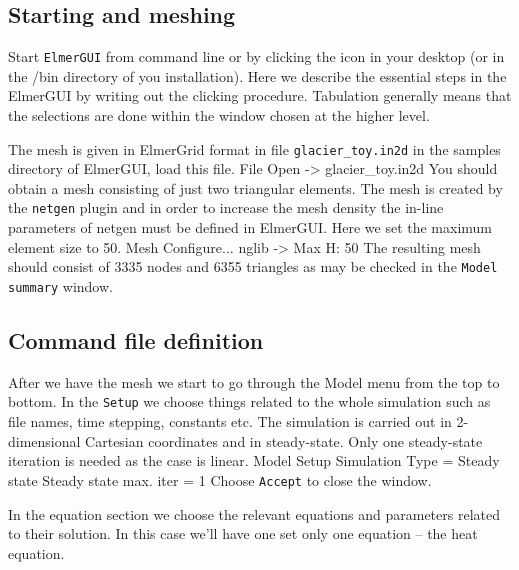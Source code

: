 \subsection*{Starting and meshing}

Start \texttt{ElmerGUI} from command line or by clicking the icon in your desktop (or in the /bin directory of you installation). 
Here we describe the essential steps in the ElmerGUI by writing out the clicking procedure. Tabulation generally means that the 
selections are done within the window chosen at the higher level. 

The mesh is given in ElmerGrid format in file \texttt{glacier\_toy.in2d} in the samples directory of ElmerGUI, 
load this file.
\ttbegin
File 
  Open -> glacier\_toy.in2d
\ttend
You should obtain a mesh consisting of just two triangular elements. The mesh is created by the \texttt{netgen} plugin 
and in order to increase the mesh density the in-line parameters of netgen must be defined in ElmerGUI.
Here we set the maximum element size to 50. 
\ttbegin
Mesh
  Configure... 
    nglib -> Max H: 50
\ttend
The resulting mesh should consist of 3335 nodes and 6355 triangles as may be checked in the 
\texttt{Model summary} window.


\subsection*{Command file definition}

After we have the mesh we start to go through the Model menu from the top to bottom. 
In the \texttt{Setup} we choose things related to the whole simulation such as file names, 
time stepping, constants etc.
The simulation is carried out in 2-dimensional Cartesian coordinates and in steady-state. 
Only one steady-state iteration is needed as the case is linear. 
\ttbegin
Model
  Setup 
    Simulation Type = Steady state
    Steady state max. iter = 1
\ttend
Choose \texttt{Accept} to close the window.

In the equation section we choose the relevant equations and parameters related to their solution. 
In this case we'll have one set only one equation -- the heat equation.


